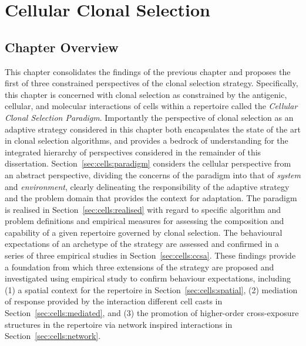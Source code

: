 %
%

\chapter{Cellular Clonal Selection}
\label{chap:cells}

%
%
\section{Chapter Overview}
\label{sec:cellsoverview}
This chapter consolidates the findings of the previous chapter and proposes the first of three constrained perspectives of the clonal selection strategy. Specifically, this chapter is concerned with clonal selection as constrained by the antigenic, cellular, and molecular interactions of cells within a repertoire called the \emph{Cellular Clonal Selection Paradigm}. Importantly the perspective of clonal selection as an adaptive strategy considered in this chapter both encapsulates the state of the art in clonal selection algorithms, and provides a bedrock of understanding for the integrated hierarchy of perspectives considered in the remainder of this dissertation. 
Section~\ref{sec:cells:paradigm} considers the cellular perspective from an abstract perspective, dividing the concerns of the paradigm into that of \emph{system} and \emph{environment}, clearly delineating the responsibility of the adaptive strategy and the problem domain that provides the context for adaptation. The paradigm is realised in Section~\ref{sec:cells:realised} with regard to specific algorithm and problem definitions and empirical measures for assessing the composition and capability of a given repertoire governed by clonal selection. The behavioural expectations of an archetype of the strategy are assessed and confirmed in a series of three empirical studies in Section~\ref{sec:cells:ccsa}. These findings provide a foundation from which three extensions of the strategy are proposed and investigated using empirical study to confirm behaviour expectations, including (1) a spatial context for the repertoire in Section~\ref{sec:cells:spatial}, (2) mediation of response provided by the interaction different cell casts in Section~\ref{sec:cells:mediated}, and (3) the promotion of higher-order cross-exposure structures in the repertoire via network inspired interactions in Section~\ref{sec:cells:network}.


